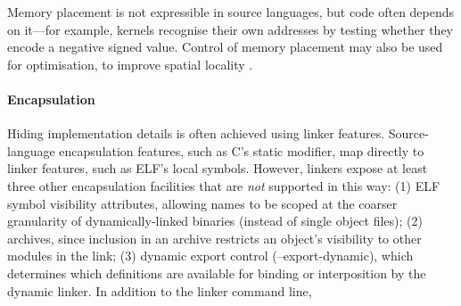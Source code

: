 \documentclass[preprint,10pt]{sigplanconf-pldi16}
\newcommand{\mynote}[2]{}
\newcommand{\sk}[1]{\mynote{SK}{#1}}
\newcommand{\ps}[1]{\mynote{PS}{#1}}
\def\Cplusplus{C\kern-0.08em\raise.2ex\hbox{\footnotesize +\kern-0.08em +}}
\begin{document}
Memory placement is not expressible in source languages, 
but code often depends on it---for example, kernels recognise their own addresses
by testing whether they encode a negative signed value.
Control of memory placement may also be used for optimisation, 
to improve spatial locality \citep{orr_fast_1993}.


\paragraph{Encapsulation}
Hiding implementation details is often achieved using linker features. 
Source-language encapsulation features, such as C's \textsf{static} modifier, 
map directly to linker features, such as ELF's local symbols.
However, linkers expose at least three other encapsulation facilities
that are \emph{not} supported in this way: (1) ELF symbol visibility attributes,
allowing names to be scoped at the coarser granularity of 
dynamically-linked binaries (instead of single object files);
(2) archives,
since inclusion in an archive restricts an object's visibility 
to other modules in the link;
(3) dynamic export control (\textsf{--export-dynamic}), which determines 
which definitions are available for binding or interposition by the dynamic linker.
In addition to the linker command line, 
\end{document}
